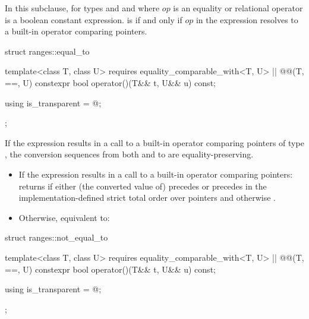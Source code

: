 \pnum
In this subclause,  for types 
and  and where $op$ is an equality or relational
operator is a boolean constant expression.
 is  if and only if $op$
in the expression  resolves to a built-in
operator comparing pointers.

%
\begin{itemdecl}
struct ranges::equal_to {
  template<class T, class U>
    requires equality_comparable_with<T, U> || @@(T, ==, U)
  constexpr bool operator()(T&& t, U&& u) const;

  using is_transparent = @\unspecnc@;
};
\end{itemdecl}

\begin{itemdescr}
\pnum
\expects
If the expression 
results in a call to a built-in operator \tcode{==} comparing pointers of type
, the conversion sequences from both  and  to 
are equality-preserving.

\pnum
\effects
\begin{itemize}
\item
  If the expression  results in
  a call to a built-in operator \tcode{==} comparing pointers:
  returns  if either (the converted value of)  precedes
   or  precedes  in the implementation-defined strict
  total order over pointers and otherwise .

\item
  Otherwise, equivalent to:
\end{itemize}
\end{itemdescr}

%
\begin{itemdecl}
struct ranges::not_equal_to {
  template<class T, class U>
    requires equality_comparable_with<T, U> || @@(T, ==, U)
  constexpr bool operator()(T&& t, U&& u) const;

  using is_transparent = @\unspecnc@;
};
\end{itemdecl}

